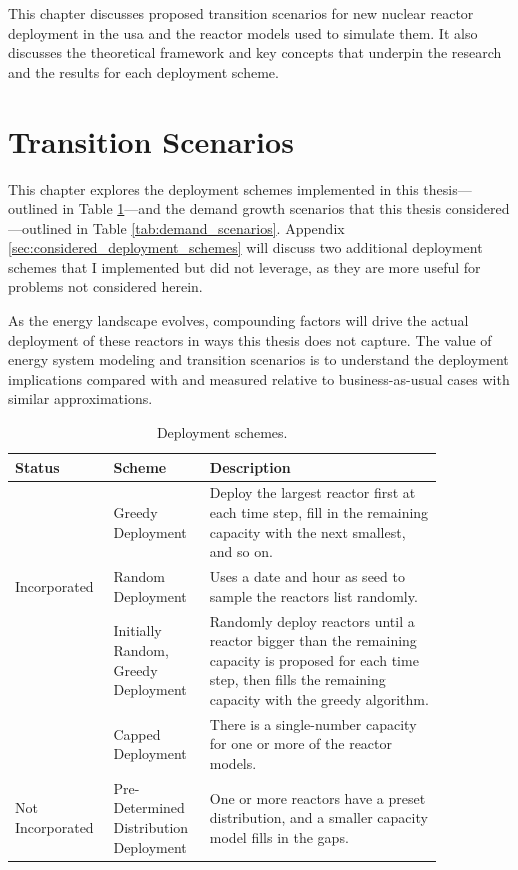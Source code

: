 This chapter discusses proposed transition scenarios for new nuclear reactor deployment in the \gls{usa} and the reactor models used to simulate them. It also discusses the theoretical framework and key concepts that underpin the research and the results for each deployment scheme.

\section{Transition Scenarios}
\label{sec:transition_scenarios}

This chapter explores the deployment schemes implemented in this thesis---outlined in Table \ref{tab:deployment_schemes}---and the demand growth scenarios that this thesis considered---outlined in Table \ref{tab:demand_scenarios}. Appendix \ref{sec:considered_deployment_schemes} will discuss two additional deployment schemes that I implemented but did not leverage, as they are more useful for problems not considered herein.

As the energy landscape evolves, compounding factors will drive the actual deployment of these reactors in ways this thesis does not capture. The value of energy system modeling and transition scenarios is to understand the deployment implications compared with and measured relative to business-as-usual cases with similar approximations.

\begin{table}[H]
    \centering
    \caption{Deployment schemes.}
    \label{tab:deployment_schemes}
    \begin{tabular}{p{0.15\linewidth} >{\raggedright}p{0.20\linewidth}>{\raggedright\arraybackslash}p{0.50\linewidth}}
        \hline
        Status & Scheme & Description \\
        \hline
         & Greedy Deployment & Deploy the largest
        reactor first at each time step, fill in the remaining capacity with
        the next smallest, and so on. \\
        Incorporated & Random Deployment & Uses a date and hour as seed to sample the
        reactors list randomly. \\
        & Initially Random, Greedy Deployment & Randomly deploy reactors until
        a reactor bigger than the remaining capacity is proposed for each time step,
        then fills the remaining capacity with the greedy algorithm. \\
        \hline
         & Capped Deployment & There is a
        single-number capacity for one or more of the reactor models. \\
        Not Incorporated & Pre-Determined Distribution Deployment & One or more reactors have a
        preset distribution, and a smaller capacity model fills in the gaps. \\
        \hline
    \end{tabular}
\end{table}

